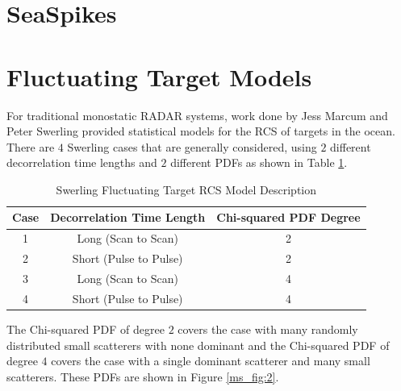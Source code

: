 \section{SeaSpikes}

\section{Fluctuating Target Models}
For traditional monostatic RADAR systems, work done by Jess Marcum and Peter Swerling provided statistical models for the RCS of targets in the ocean\cite{richards_radar}. There are $4$ Swerling cases that are generally considered, using $2$ different decorrelation time lengths and $2$ different PDFs as shown in Table \ref{ms_tab:1}. 

\begin{table}[H]
  \begin{center}
      \renewcommand{\baselinestretch}{1} \small\normalsize
  \begin{quote}
    \caption[Swerling Fluctuating Target RCS Model Description]{Swerling Fluctuating Target RCS Model Description\label{ms_tab:1}}
  \end{quote}
  \begin{tabular} {|c | c | c |}
    \hline
  \bf{Case} & \bf{Decorrelation Time Length} & \bf{Chi-squared PDF Degree} \\ \hline
  1 &Long (Scan to Scan) &2 \\ \hline
  2 &Short (Pulse to Pulse) &2 \\ \hline
  3 &Long (Scan to Scan) &4 \\ \hline
  4 &Short (Pulse to Pulse) &4 \\ \hline
\end{tabular}
\end{center}
\end{table}
\renewcommand{\baselinestretch}{2} \small\normalsize
The Chi-squared PDF of degree $2$ covers the case with many randomly distributed small scatterers with none dominant and the Chi-squared PDF of degree $4$ covers the case with a single dominant scatterer and many small scatterers. These PDFs are shown in Figure \ref{ms_fig:2}.
